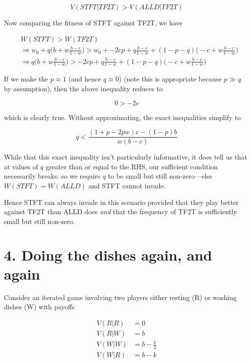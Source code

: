 \documentclass{article}
\begin{document}
\begin{equation*}
    V(STFT|TF2T) > V(ALLD|TF2T)
\end{equation*}

Now comparing the fitness of STFT against TF2T, we have

\begin{align*}
    &W(STFT) > W(TF2T) \\
    &\Rightarrow w_0 + q \Big(b + w \frac{b - c}{1 - w}\Big) > w_0 + - 2 c p + q \frac{b - c}{1 - w} + (1 - p - q) \Big(- c + w \frac{b - c}{1 - w}\Big) \\
    &\Rightarrow q \Big(b + w \frac{b - c}{1 - w}\Big) > - 2 c p + q \frac{b - c}{1 - w} + (1 - p - q) \Big(- c + w \frac{b - c}{1 - w}\Big)
\end{align*}

If we make the $p \approx 1$ (and hence $q \approx 0$) (note this is
appropriate because $p \gg q$ by assumption), then the above inequality
reduces to

\begin{equation*}
    0 > - 2 c
\end{equation*}

which is clearly true. Without approximating, the exact inequalities
simplify to

\begin{equation*}
    q < \frac{(1 + p - 2 p w) c - (1 - p) b}{w (b - c)}
\end{equation*}

While that this exact inequality isn't particularly informative, it does
tell us that at values of $q$ greater than or equal to the RHS, our
sufficient condition necessarily breaks: so we require $q$ to be small
but still non-zero---else $W(STFT) = W(ALLD)$ and STFT cannot invade.

Hence STFT can always invade in this scenario provided that they play
better against TF2T than ALLD does \textit{and} that the frequency of
TF2T is sufficiently small but still non-zero.

\section*{4. Doing the dishes again, and again}

Consider an iterated game involving two players either resting (R) or
washing dishes (W) with payoffs

\begin{align*}
    V(R|R) &= 0 \\
    V(R|W) &= b \\
    V(W|W) &= b - \frac{k}{2} \\
    V(W|R) &= b - k
\end{align*}
\end{document}
